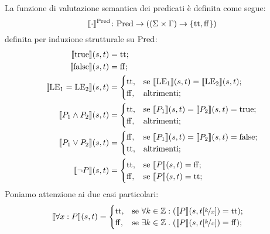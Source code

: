 \begin{definizione} 
La funzione di valutazione semantica dei predicati è definita come segue:
\[
   \mathord{\llbracket \cdot \rrbracket ^{\mathrm{Pred}}}\colon\mathrm{Pred}\to((\Sigma \times \Gamma) \rightarrow \{\mathrm{tt},\mathrm{ff}\})
\]
definita per induzione strutturale su $\mathrm{Pred}$:
\begin{align*}
   \llbracket \mathrm{true} \rrbracket(s,t)
      &= \mathrm{tt};\\
   \llbracket \mathrm{false} \rrbracket(s,t)
      &= \mathrm{ff};\\
   \llbracket \mathrm{LE}_1 = \mathrm{LE}_2\rrbracket(s,t)
      &=
        \begin{cases}
                \mathrm{tt}, &\text{se $\llbracket\mathrm{LE}_1\rrbracket(s,t) = \llbracket \mathrm{LE}_2 \rrbracket(s,t)$};\\
                \mathrm{ff}, &\text{altrimenti};
        \end{cases}\\
    \llbracket P_1 \land P_2\rrbracket(s,t)
      &=
        \begin{cases}
                \mathrm{tt}, &\text{se $\llbracket P_1\rrbracket(s,t) = \llbracket P_2\rrbracket(s,t) = \mathrm{true}$};\\
                \mathrm{ff}, &\text{altrimenti};
        \end{cases}\\
    \llbracket P_1 \lor P_2\rrbracket(s,t)
      &=
        \begin{cases}
                \mathrm{ff}, &\text{se $\llbracket P_1\rrbracket(s,t) = \llbracket P_2\rrbracket(s,t) = \mathrm{false}$};\\
                \mathrm{tt}, &\text{altrimenti};
        \end{cases} \\
    \llbracket \neg P\rrbracket(s,t)
       &=
        \begin{cases}
                \mathrm{tt},&\text{se $\llbracket P\rrbracket(s,t) = \mathrm{ff}$};\\
                \mathrm{ff},&\text{se $\llbracket P\rrbracket(s,t) = \mathrm{tt}$};
        \end{cases}
\end{align*}
Poniamo attenzione ai due casi particolari:
\begin{align*}
   \llbracket\forall x \mathrel{:} P\rrbracket(s,t)
      &=
        \begin{cases}
                \mathrm{tt}, &\text{se $\forall k\in\mathbb{Z}\mathrel{:}(\llbracket P\rrbracket(s,t[\nicefrac{k}{x}]) = \mathrm{tt}$});\\
                \mathrm{ff}, &\text{se $\exists k\in\mathbb{Z}\mathrel{.}(\llbracket P\rrbracket(s,t[\nicefrac{k}{x}]) = \mathrm{ff}$});

\end{cases}
\end{align*}
\end{definizione}
